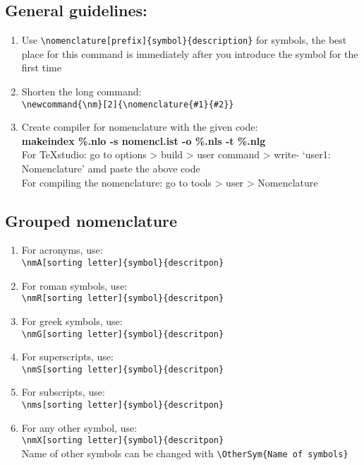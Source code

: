 \subsection{General guidelines:}
\begin{enumerate}
        \item Use \verb|\nomenclature[prefix]{symbol}{description}| for symbols, the best place for this command is immediately after you introduce the symbol for the first time
        \item Shorten the long command:\\ \verb|\newcommand{\nm}[2]{\nomenclature{#1}{#2}}|
        \item Create compiler for nomenclature with the given code: \\
        \textbf{makeindex \%.nlo -s nomencl.ist -o \%.nls -t \%.nlg }\\
        For TeXstudio: go to options > build > user command > write- `user1: Nomenclature' amd paste the above code\\
        For compiling the nomenclature: go to tools > user > Nomenclature
\end{enumerate}

\subsection{Grouped nomenclature}
\begin{enumerate}
\item For acronyms, use:\\
 \verb|\nmA[sorting letter]{symbol}{descritpon}|
\item For roman symbols, use:\\
\verb|\nmR[sorting letter]{symbol}{descritpon}|
\item For greek symbols, use:\\
 \verb|\nmG[sorting letter]{symbol}{descritpon}|
 \item For superscripts, use:\\
 \verb|\nmS[sorting letter]{symbol}{descritpon}|
 \item For subscripts, use:\\
 \verb|\nms[sorting letter]{symbol}{descritpon}|
 \item For any other symbol, use:\\
 \verb|\nmX[sorting letter]{symbol}{descritpon}|\\
 Name of other symbols can be changed with \verb|\OtherSym{Name of symbols}|
\end{enumerate}
